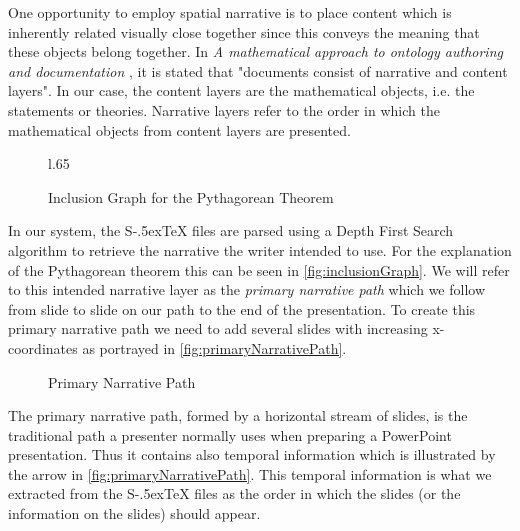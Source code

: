 \documentclass{llncs}
\def\stex{\texorpdfstring{\raisebox{-.5ex}S\kern-.5ex\TeX}{sTeX}\xspace}
\begin{document}
One opportunity to employ spatial narrative is to place content which is inherently related visually close together since this conveys the meaning that these objects belong together. In \textit{A mathematical approach to ontology authoring and documentation} \cite{LK:MathOntoAuthDoc09}, it is stated that "documents consist of narrative and content layers". In our case, the content layers are the mathematical objects, i.e. the statements or theories. Narrative layers refer to the order in which the mathematical objects from content layers are presented.

\begin{figure}l{.65\textwidth}\vspace{-2em}
  \caption{Inclusion Graph for the Pythagorean Theorem}\label{fig:inclusionGraph}
\end{figure}

In our system, the \stex files are parsed using a Depth First Search algorithm to retrieve the narrative the writer intended to use. For the explanation of the Pytha\-go\-rean theorem this can be seen in \autoref{fig:inclusionGraph}. We will refer to this intended narrative layer as the \textit{primary narrative path} which we follow from slide to slide on our path to the end of the presentation. To create this primary narrative path we need to add several slides with increasing x-coordinates as portrayed in \autoref{fig:primaryNarrativePath}.

\begin{figure}\centering\vspace{-2em}
  \vspace{-1em}
  \caption{Primary Narrative Path}\label{fig:primaryNarrativePath}
  \vspace{-1em}
\end{figure}
The primary narrative path, formed by a horizontal stream of slides, is the traditional
path a presenter normally uses when preparing a PowerPoint presentation. Thus it contains
also temporal information which is illustrated by the arrow in
\autoref{fig:primaryNarrativePath}. This temporal information is what we extracted from
the \stex files as the order in which the slides (or the information on the slides) should
appear.
\end{document}
